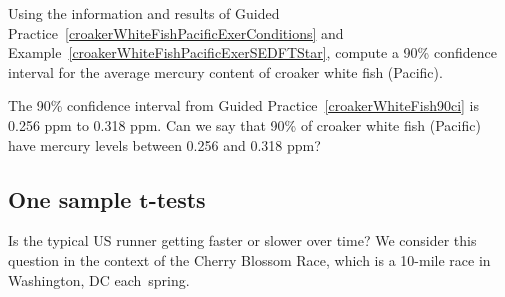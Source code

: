 \begin{exercisewrap}
\begin{nexercise}
\label{croakerWhiteFish90ci}
Using the information and results of Guided Practice~\ref{croakerWhiteFishPacificExerConditions} and Example~\ref{croakerWhiteFishPacificExerSEDFTStar}, compute a 90\% confidence interval for the average mercury content of croaker white fish (Pacific).\footnotemark{}
\end{nexercise}
\end{exercisewrap}

\begin{exercisewrap}
\begin{nexercise}
The 90\% confidence interval from
Guided Practice~\ref{croakerWhiteFish90ci}
is 0.256 ppm to 0.318 ppm.
Can we say that 90\% of croaker white fish (Pacific)
have mercury levels between 0.256 and 0.318 ppm?\footnotemark{}
\end{nexercise}
\end{exercisewrap}




\subsection[One sample $t$-tests]
    {One sample $\mathbf{t}$-tests}
\label{oneSampleTTests}

\newcommand{\cherryblossomn}{100}
\newcommand{\cherryblossommean}{97.32}
\newcommand{\cherryblossomnull}{93.29}
\newcommand{\cherryblossomsd}{16.98}
\newcommand{\cherryblossomse}{1.70}
\newcommand{\cherryblossomz}{2.37}

\noindent%
Is the typical US runner getting faster or slower over time? We consider this question in the context of the Cherry Blossom Race, which is a 10-mile race in Washington, DC each~spring.

